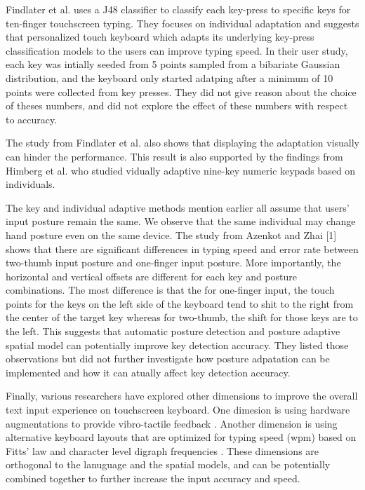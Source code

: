 \documentclass{sigchi}
\begin{document}
Findlater et al. \cite{Findlater:2012} uses a J48 classifier to classify
each key-press to specific keys for ten-finger touchscreen typing. They
focuses on individual adaptation and suggests that personalized touch keyboard
which adapts its underlying key-press classification models to the users can improve typing speed.  
In their user study, each key was intially seeded from 5 points sampled from
a bibariate Gaussian distribution, and the keyboard only started adatping
after a minimum of 10 points were collected from key presses. They did not
give reason about the choice of theses numbers, and did not explore the
effect of these numbers with respect to accuracy. 

The study from Findlater et al. also shows that displaying the adaptation visually can hinder
the performance. This result is also supported by the findings from Himberg et al. \cite{Himberg:2003} who 
studied vidually adaptive nine-key numeric keypads based on individuals.  

The key and individual adaptive methods mention earlier all assume that users' input posture
remain the same. We observe that the same individual may change hand posture even on the same device. 
The study from Azenkot and Zhai [1] shows that there are significant differences 
in typing speed and error rate between two-thumb input posture and one-finger 
input posture. More importantly, the horizontal and vertical offsets are 
different for each key and posture combinations. The most difference is that the for
one-finger input, the touch points for the keys on the left side of the keyboard tend to
shit to the right from the center of the target key whereas for two-thumb, the shift for those
keys are to the left. This suggests that automatic posture detection and posture
adaptive spatial model can potentially improve key detection accuracy. They listed those observations but
did not further investigate how posture adpatation can be implemented and how it can atually
affect key detection accuracy.

Finally, various researchers have explored other dimensions to improve the overall
text input experience on touchscreen keyboard. One dimesion is using hardware
augmentations to provide vibro-tactile feedback \cite{Hoggan:2008, Brewster:2007}. 
Another dimension is using alternative keyboard layouts that are optimized for typing speed (wpm)
based on Fitts' law and character level digraph frequencies \cite{Zhai:2000, MacKenzie:1999}.
These dimensions are orthogonal to the lanuguage and the spatial models, and can be potentially 
combined together to further increase the input accuracy and speed.
\end{document}

